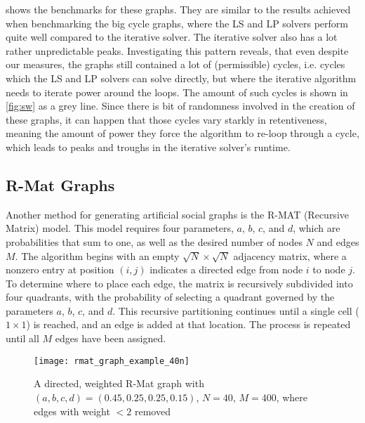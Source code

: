  shows the benchmarks for these graphs. They are similar to the results achieved when benchmarking the big cycle graphs, where the LS and LP solvers perform quite well compared to the iterative solver. The iterative solver also has a lot rather unpredictable peaks. Investigating this pattern reveals, that even despite our measures, the graphs still contained a lot of (permissible) cycles, i.e. cycles which the LS and LP solvers can solve directly, but where the iterative algorithm needs to iterate power around the loops. The amount of such cycles is shown in \cref{fig:sw} as a grey line. Since there is bit of randomness involved in the creation of these graphs, it can happen that those cycles vary starkly in retentiveness, meaning the amount of power they force the algorithm to re-loop through a cycle, which leads to peaks and troughs in the iterative solver's runtime. 
 
\subsection{R-Mat Graphs}

Another method for generating artificial social graphs is the R-MAT (Recursive Matrix) model. \cite{chakrabartiRMATRecursiveModel2004} This model requires four parameters, $a$, $b$, $c$, and $d$, which are probabilities that sum to one, as well as the desired number of nodes $N$ and edges $M$. The algorithm begins with an empty $\sqrt{N} \times \sqrt{N}$ adjacency matrix, where a nonzero entry at position $(i, j)$ indicates a directed edge from node $i$ to node $j$. To determine where to place each edge, the matrix is recursively subdivided into four quadrants, with the probability of selecting a quadrant governed by the parameters $a$, $b$, $c$, and $d$. This recursive partitioning continues until a single cell ($1 \times 1$) is reached, and an edge is added at that location. The process is repeated until all $M$ edges have been assigned.

\begin{figure}
\centering
\texttt{[image: rmat\_graph\_example\_40n]}
\caption{A directed, weighted R-Mat graph with $(a, b, c, d) = (0.45, 0.25, 0.25, 0.15)$, $N = 40$, $M = 400$, where edges with weight $< 2$ removed}
\label{fig:rmat_example}
\end{figure}

